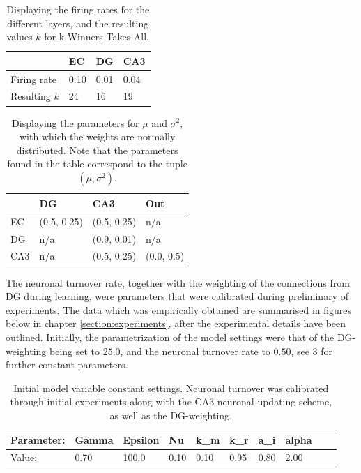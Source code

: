 \begin{table}
\centering
\caption{Displaying the firing rates for the different layers, and the resulting values $k$ for k-Winners-Takes-All.}
\label{table:firing_rates}
\begin{tabular}{l|l|l|l|}
\cline{2-4}
                                  & EC   & DG   & CA3  \\ \hline
\multicolumn{1}{|l|}{Firing rate} & 0.10 & 0.01 & 0.04 \\ \hline
\multicolumn{1}{|l|}{Resulting $k$} & 24 & 16 & 19 \\ \hline
\end{tabular}
\end{table}

\begin{table}[]
\centering
\caption{Displaying the parameters for $\mu$ and $\sigma^2$, with which the weights are normally distributed. Note that the parameters found in the table correspond to the tuple $(\mu, \sigma^2)$.}
\label{table:initial_weight_distributions}
\begin{tabular}{l|l|l|l|}
\cline{2-4}
                          & DG        & CA3       & Out      \\ \hline
\multicolumn{1}{|l|}{EC}  & (0.5, 0.25) & (0.5, 0.25) & n/a      \\ \hline
\multicolumn{1}{|l|}{DG}  & n/a       & (0.9, 0.01) & n/a      \\ \hline
\multicolumn{1}{|l|}{CA3} & n/a       & (0.5, 0.25) & (0.0, 0.5) \\ \hline
\end{tabular}
\end{table}

The neuronal turnover rate, together with the weighting of the connections from DG during learning, were parameters that were calibrated during preliminary of experiments. The data which was empirically obtained are summarised in figures below in chapter \ref{section:experiments}, after the experimental details have been outlined. Initially, the parametrization of the model settings were that of the DG-weighting being set to $25.0$, and the neuronal turnover rate to $0.50$, see \ref{table:initial_settings} for further constant parameters.

\begin{table}
\centering
\caption{Initial model variable constant settings. Neuronal turnover was calibrated through initial experiments along with the CA3 neuronal updating scheme, as well as the DG-weighting.}
\label{table:initial_settings}
\begin{tabular}{|l|l|l|l|l|l|l|l|l|l|}
\cline{1-8}
Parameter: & Gamma & Epsilon & Nu   & k\_m & k\_r & a\_i & alpha \\ \hline
Value:     & 0.70  & 100.0   & 0.10 & 0.10 & 0.95 & 0.80 & 2.00 \\ \hline
\end{tabular}
\end{table}


